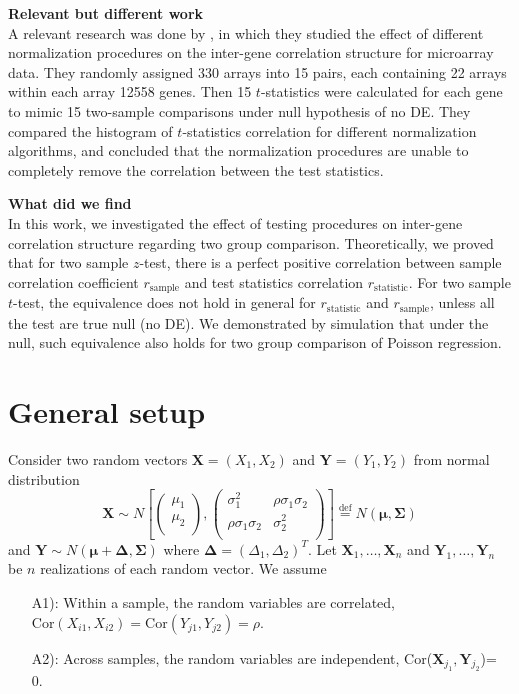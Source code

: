 \documentclass[12pt, a4paper]{article}
\begin{document}
	\textbf{Relevant but different work}\\
	A relevant research was done by \citet{qiu2005effects}, in which they studied the effect of different
	normalization procedures on the inter-gene correlation structure for microarray data. They randomly
	assigned 330 arrays into 15 pairs, each containing 22 arrays within each array 12558 genes. Then 15
	$t$-statistics were calculated for each gene to mimic 15 two-sample comparisons under null
	hypothesis of no DE. They compared the histogram of $t$-statistics correlation for different
	normalization algorithms, and concluded that the normalization procedures are unable to completely
	remove the correlation between the test statistics. %
	
	\textbf{What did we find}\\
	In this work, we investigated the effect of testing procedures on inter-gene correlation structure
	regarding two group comparison. Theoretically, we proved that for two sample $z$-test, there is a
	perfect positive correlation between sample correlation coefficient $r_{\text{sample}}$ and test
	statistics correlation $r_{\text{statistic}}$. For two sample $t$-test, the equivalence does not
	hold in general for $r_{\text{statistic}}$ and $r_{\text{sample}}$, unless all the test are true
	null (no DE).  We demonstrated by simulation that under the null, such equivalence also holds for
	two group comparison of Poisson regression. 
	
	
	
	
	
	
	
	\section{General setup}
	Consider two random vectors $\bm X = (X_1, X_2)$ and $\bm Y =  (Y_1, Y_2)$ from normal distribution
	\[ \bm X 
	\sim N\left[
	\left(\begin{array}{c}
	\mu_1\\
	\mu_2\\
	\end{array} \right), 
	\left(
	\begin{array}{cc}
	\sigma_1^2 &\rho \sigma_1\sigma_2 \\
	\rho \sigma_1 \sigma_2 & 	\sigma_2^2 \\
	\end{array}
	\right)
	\right]  \stackrel{\text{def}}{=} N(\bm \mu, \bm \Sigma)
	\] 
	and $\bm Y \sim N(\bm \mu + \bm \Delta, \bm \Sigma)$ where $\bm \Delta = (\Delta_1, \Delta_2)^T$.
	Let $\bm X_1, \ldots, \bm X_n$ and $\bm Y_1, \ldots, \bm Y_n$ be $n$ realizations of each random
	vector. We assume
	\begin{enumerate}
		\item[A1):] Within a sample, the random variables are correlated, $\text{Cor}(X_{i1}, X_{i2}) =
		\text{Cor}(Y_{j1}, Y_{j2}) = \rho$. 
		\item[A2):] Across samples, the random variables are independent, Cor($\bm X_{j_1}, \bm Y_{j_2}$)=
		0. 
	\end{enumerate} 
	
\end{document}
